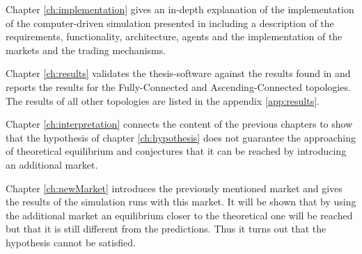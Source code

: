 \documentclass[Bachelorarbeit.tex]{subfiles}
\begin{document}
\bigskip

Chapter \ref{ch:implementation} gives an in-depth explanation of the implementation of the computer-driven simulation presented in \cite{Breuer2015} including a description of the requirements, functionality, architecture, agents and the implementation of the markets and the trading mechanisms.

\bigskip

Chapter \ref{ch:results} validates the thesis-software against the results found in \cite{Breuer2015} and reports the results for the Fully-Connected and Ascending-Connected topologies. The results of all other topologies are listed in the appendix \ref{app:results}.

\bigskip

Chapter \ref{ch:interpretation} connects the content of the previous chapters to show that the hypothesis of chapter \ref{ch:hypothesis} does not guarantee the approaching of theoretical equilibrium and conjectures that it can be reached by introducing an additional market.

\bigskip

Chapter \ref{ch:newMarket} introduces the previously mentioned market and gives the results of the simulation runs with this market. It will be shown that by using the additional market an equilibrium closer to the theoretical one will be reached but that it is still different from the predictions. Thus it turns out that the hypothesis cannot be satisfied.
\end{document}
